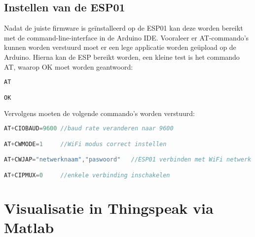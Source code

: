 \subsection{Instellen van de ESP01}
\label{subsec:instellen}

Nadat de juiste firmware is geïnstalleerd op de ESP01 kan deze worden bereikt met de command-line-interface in de Arduino IDE. Vooraleer er AT-commando's kunnen worden verstuurd moet er een lege applicatie worden geüpload op de Arduino. Hierna kan de ESP bereikt worden, een kleine test is het commando AT, waarop OK moet worden geantwoord:

\begin{lstlisting}[language=Java,caption={Test of de ESP01 bereikbaar is}]
AT

OK
\end{lstlisting}

Vervolgens moeten de volgende commando's worden verstuurd:
\begin{lstlisting}[language=Java,caption={ESP01 voorbereiden}]
AT+CIOBAUD=9600 //baud rate veranderen naar 9600

AT+CWMODE=1     //WiFi modus correct instellen

AT+CWJAP="netwerknaam","paswoord"   //ESP01 verbinden met WiFi netwerk

AT+CIPMUX=0     //enkele verbinding inschakelen    
\end{lstlisting}


\section{Visualisatie in Thingspeak via Matlab}
\label{sec:matlab}

